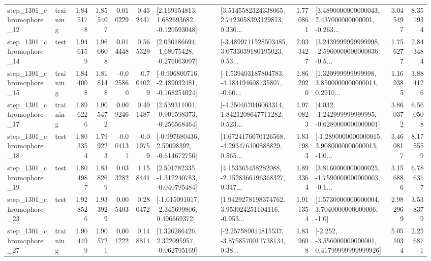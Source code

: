 \begin{tabular}{llrrrrllrlrr}
 step\_1301\_chromophore\_12 &  training &      1.845178 &    1.855407 &      0.010229 &  0.432447 &    [2.169154813, 1.682693682, -0.120593048] &  [3.5145582324338065, 2.7423058393129813, 0.330... &       1.770861 &  [3.4890000000000043, 2.437000000000001, -0.263... &            3.045497 &          8.351934 \\
 step\_1301\_chromophore\_14 &      test &      1.946159 &    1.960608 &      0.014448 &  0.565329 &    [2.030186694, -1.68075428, -0.276063097] &  [-3.4899711528503485, 3.0733039180195023, 0.53... &       2.033427 &  [3.2439999999999998, -2.5960000000000036, -0.5... &            1.756277 &          2.843484 \\
 step\_1301\_chromophore\_15 &  training &      1.844008 &    1.818148 &     -0.025860 & -0.704029 &  [-0.906800716, -2.489032481, -0.168254024] &  [-1.539403187804783, -4.184194608735807, -0.60... &       1.862020 &  [1.320999999999998, 3.8500000000000014, 0.2910... &            1.169385 &          3.884126 \\
 step\_1301\_chromophore\_17 &  training &      1.896226 &    1.905472 &      0.009246 &  0.401487 &   [2.539311001, -0.901598373, -0.256568464] &  [-4.250467046063314, 1.8421208647711282, 0.523... &       1.970823 &   [4.032, -1.242999999999995, -0.6280000000000001] &            3.860372 &          6.560508 \\
 step\_1301\_chromophore\_18 &      test &      1.803354 &    1.799223 &     -0.004131 & -0.019759 &    [-0.997680436, 2.59098392, -0.614672756] &  [1.6724176070126568, -4.293476400888829, 0.565... &       1.831983 &  [-1.2890000000000015, 3.9080000000000013, -1.0... &            3.460817 &          8.175559 \\
 step\_1301\_chromophore\_19 &      test &      1.804987 &    1.838269 &      0.033282 &  1.158441 &   [2.501782335, -1.312240783, -0.040795484] &  [4.153365458282088, -2.1528366196368327, 0.347... &       1.893364 &  [3.8160000000000025, -1.7590000000000003, -0.1... &            3.156886 &          6.786317 \\
 step\_1301\_chromophore\_23 &      test &      1.928526 &    1.933929 &      0.005403 &  0.280472 &   [-1.015091017, -2.345699806, 0.496669372] &  [1.9429278198374762, 3.953024251104116, -0.953... &       1.911354 &     [1.5730000000000004, 3.7040000000000006, -1.0] &            2.982969 &          3.538379 \\
 step\_1301\_chromophore\_27 &  training &      1.904499 &    1.905721 &      0.001222 &  0.148814 &    [1.326286426, 2.322095957, -0.062795169] &  [-2.257589014815537, -3.8758570011738134, 0.38... &       1.839698 &  [-2.252, -3.556000000000001, 0.41799999999999926] &            5.051034 &          2.256871 \\

\end{tabular}
